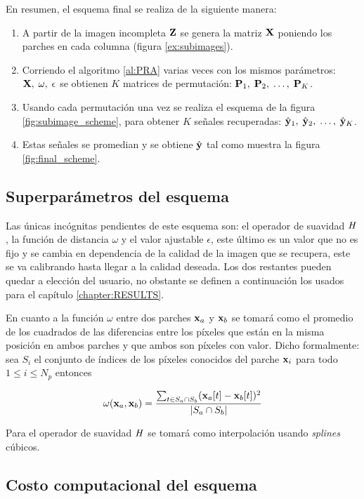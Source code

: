 En resumen, el esquema final se realiza de la siguiente manera:
\begin{enumerate}
	\item A partir de la imagen incompleta $\Z$ se genera la matriz $\X$ poniendo los parches en cada columna (figura \ref{ex:subimages}).
	\item Corriendo el algoritmo \ref{al:PRA} varias veces con los mismos par\'ametros: $\X,\; \omega,\; \epsilon$ se obtienen $K$ matrices de permutaci\'on: $\P_1,\; \P_2,\; \dots,\; \P_K$.
	\item Usando cada permutaci\'on una vez se realiza el esquema de la figura \ref{fig:subimage_scheme}, para obtener $K$ señales recuperadas: $\yhat_1,\; \yhat_2,\; \dots,\; \yhat_K$. 
	\item Estas señales se promedian y se obtiene $\yhat$ tal como muestra la figura \ref{fig:final_scheme}.
\end{enumerate}

\subsection{Superpar\'ametros del esquema}
Las \'unicas incógnitas pendientes de este esquema son: el operador de suavidad $\H$, la funci\'on de distancia $\omega$ y el valor ajustable $\epsilon$, este \'ultimo es un valor que no es fijo y se cambia en dependencia de la calidad de la imagen que se recupera, este se va calibrando hasta llegar a la calidad deseada. Los dos restantes pueden quedar a elecci\'on del usuario, no obstante se definen a continuaci\'on los usados para el cap\'itulo \ref{chapter:RESULTS}.

En cuanto a la funci\'on $\omega$ entre dos parches $\x_a$ y $\x_b$ se tomar\'a como el promedio de los cuadrados de las diferencias entre los p\'ixeles que est\'an en la misma posici\'on en ambos parches y que ambos son p\'ixeles con valor. Dicho formalmente: sea $S_i$ el conjunto de \'indices de los p\'ixeles conocidos del parche $\x_i$ para todo $1 \le i \le N_p$ entonces

\begin{equation}
\omega(\x_a, \x_b) = \frac{\sum_{t \in S_a \cap S_b} (\x_a[t] - \x_b[t])^2}{|S_a \cap S_b|}
\end{equation}

Para el operador de suavidad $\H$ se tomar\'a como interpolaci\'on usando \textit{splines} c\'ubicos.

\subsection{Costo computacional del esquema}
